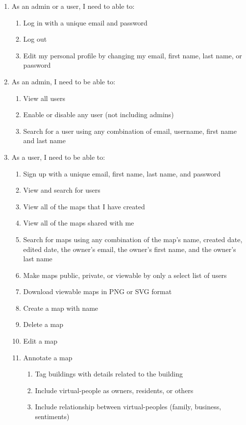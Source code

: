 \begin{enumerate}
  \item As an admin or a user, I need to able to:
  \begin{enumerate}
    \item Log in with a unique email and password
    \item Log out
    \item Edit my personal profile by changing my email, first name, last name, or password
  \end{enumerate}
  \item As an admin, I need to be able to:
  \begin{enumerate}
    \item View all users
    \item Enable or disable any user (not including admins)
    \item Search for a user using any combination of email, username, first name and last name
  \end{enumerate}
  \item As a user, I need to be able to:
  \begin{enumerate}
    \item Sign up with a unique email, first name, last name, and password
    \item View and search for users
    \item View all of the maps that I have created
    \item View all of the maps shared with me
    \item Search for maps using any combination of the map's name, created date, edited date, the owner's email, the owner's first name, and the owner's last name
    \item Make maps public, private, or viewable by only a select list of users
    \item Download viewable maps in PNG or SVG format
    \item Create a map with name
    \item Delete a map
    \item Edit a map
    \item Annotate a map
    \begin{enumerate}
      \item Tag buildings with details related to the building
      \item Include virtual-people as owners, residents, or others
      \item Include relationship between virtual-peoples (family, business, sentiments)
    \end{enumerate}
  \end{enumerate}
\end{enumerate}

